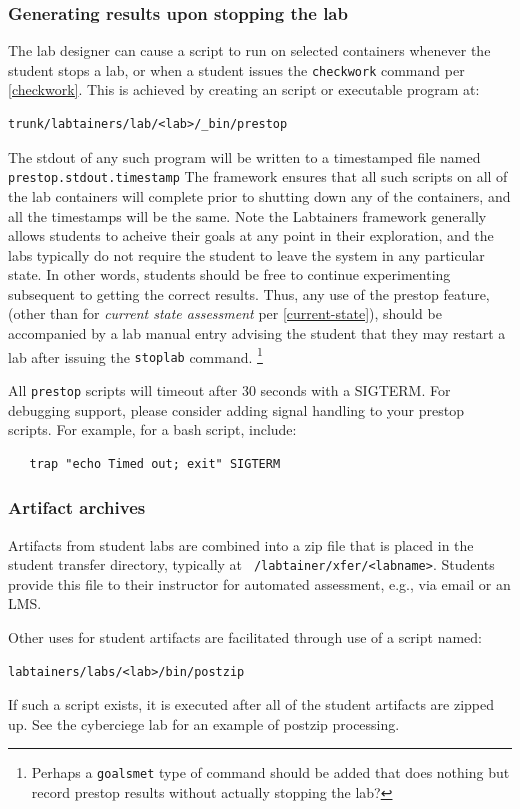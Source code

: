 \documentclass[12pt]{article}
\begin{document}
\subsubsection{Generating results upon stopping the lab}
\label{prestop}
The lab designer can cause a script to run on selected containers whenever the student stops a lab,
or when a student issues the {\tt checkwork} command per \ref{checkwork}.
This is achieved by creating an script or executable program at:
\begin{verbatim}
trunk/labtainers/lab/<lab>/_bin/prestop
\end{verbatim}
The stdout of any such program will be written to a timestamped file named {\tt prestop.stdout.timestamp}
The framework ensures that all such scripts on all of the lab containers will complete prior to
shutting down any of the containers, and all the timestamps
will be the same.  Note the Labtainers framework generally allows students to acheive their goals at any
point in their exploration, and the labs typically do not require the student to leave the system in any
particular state.  In other words, students should be free to continue experimenting subsequent to getting
the correct results.  Thus, any use of the prestop feature, (other than for \textit{current state assessment}
per \ref{current-state}), should be accompanied by a lab manual entry
advising the student that they may restart a lab after issuing the {\tt stoplab} command. \footnote{Perhaps a
{\tt goalsmet} type of command should be added that does nothing but record prestop results without actually
stopping the lab?}

All {\tt prestop} scripts will timeout after 30 seconds with a SIGTERM.  For debugging support, please consider
adding signal handling to your prestop scripts. For example, for a bash script, include:
\begin{verbatim}
   trap "echo Timed out; exit" SIGTERM
\end{verbatim}


\subsubsection{Artifact archives}
Artifacts from student labs are combined into a zip file that is placed in the student transfer
directory, typically at {\tt ~/labtainer/xfer/<labname>}.  Students provide this file to their
instructor for automated assessment, e.g., via email or an LMS.  

Other uses for student artifacts are facilitated through use of a script named:
\begin{verbatim}
labtainers/labs/<lab>/bin/postzip
\end{verbatim}
\noindent If such a script exists, it is executed after all of the student artifacts are zipped up.  See
the cyberciege lab for an example of postzip processing.
\end{document}
